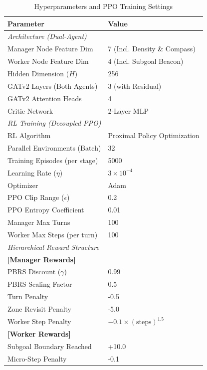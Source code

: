 \begin{table}[!ht]
  \centering
  \caption{Hyperparameters and PPO Training Settings}
  \label{tab:hyperparameters}
  \begin{tabular}{l l}
    \toprule
    Parameter & Value \\
    \midrule
    \multicolumn{2}{l}{\textit{Architecture (Dual-Agent)}} \\
    \quad Manager Node Feature Dim & 7 (Incl. Density \& Compass) \\
    \quad Worker Node Feature Dim & 4 (Incl. Subgoal Beacon) \\
    \quad Hidden Dimension ($H$) & 256 \\
    \quad GATv2 Layers (Both Agents) & 3 (with Residual) \cite{brody2022how} \\
    \quad GATv2 Attention Heads & 4 \\
    \quad Critic Network & 2-Layer MLP \\
    \midrule
    \multicolumn{2}{l}{\textit{RL Training (Decoupled PPO)}} \\
    \quad RL Algorithm & Proximal Policy Optimization \\
    \quad Parallel Environments (Batch) & 32 \\
    \quad Training Episodes (per stage) & 5000 \\
    \quad Learning Rate ($\eta$) & $3 \times 10^{-4}$ \\
    \quad Optimizer & Adam \\
    \quad PPO Clip Range ($\epsilon$) & 0.2 \\
    \quad PPO Entropy Coefficient & 0.01 \\
    \quad Manager Max Turns & 100 \\
    \quad Worker Max Steps (per turn) & 100 \\
    \midrule
    \multicolumn{2}{l}{\textit{Hierarchical Reward Structure}} \\
    \quad \textbf{[Manager Rewards]} & \\
    \quad PBRS Discount ($\gamma$) & 0.99 \\
    \quad PBRS Scaling Factor & 0.5 \\
    \quad Turn Penalty & -0.5 \\
    \quad Zone Revisit Penalty & -5.0 \\
    \quad Worker Step Penalty & $-0.1 \times (\text{steps})^{1.5}$ \\
    \quad \textbf{[Worker Rewards]} & \\
    \quad Subgoal Boundary Reached & +10.0 \\
    \quad Micro-Step Penalty & -0.1 \\
    \bottomrule
  \end{tabular}
\end{table}